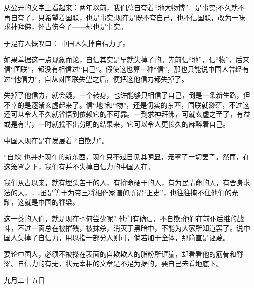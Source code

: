 
    从公开的文字上看起来：两年以前，我们总自夸着“地大物博”，是事实;不久就不再自夸了，只希望着国联，也是事实;现在是既不夸自己，也不信国联，改为一味求神拜佛，怀古伤今了——却也是事实。

    于是有人慨叹曰： 中国人失掉自信力了。

    如果单据这一点现象而论，自信其实是早就失掉了的。先前信“地”，信“物”，后来信“国联”，都没有相信过“自己”。假使这也算一种“信”，那也只能说中国人曾经有过“他信力”，自从对国联失望之后，便把这他信力都失掉了。

    失掉了他信力，就会疑，一个转身，也许能够只相信了自己，倒是一条新生路，但不幸的是逐渐玄虚起来了。信“地”和“物”，还是切实的东西，国联就渺茫，不过这还可以令人不久就省悟到依赖它的不可靠。一到求神拜佛，可就玄虚之至了，有益或是有害，一时就找不出分明的结果来，它可以令人更长久的麻醉着自己。

    中国人现在是在发展着 “自欺力”。

    “自欺”也并非现在的新东西，现在只不过日见其明显，笼罩了一切罢了。然而，在这笼罩之下，我们有并不失掉自信力的中国人在。

    我们从古以来，就有埋头苦干的人，有拚命硬干的人，有为民请命的人，有舍身求法的人，……虽是等于为帝王将相作家谱的所谓“正史”，也往往掩不住他们的光耀，这就是中国的脊梁。

    这一类的人们，就是现在也何尝少呢? 他们有确信，不自欺;他们在前仆后继的战斗，不过一面总在被摧残，被抹杀，消灭于黑暗中，不能为大家所知道罢了。说中国人失掉了自信力，用以指一部分人则可，倘若加于全体，那简直是诬蔑。

    要论中国人，必须不被搽在表面的自欺欺人的脂粉所诓骗，却看看他的筋骨和脊梁。自信力的有无，状元宰相的文章是不足为据的，要自己去看地底下。

    \hfill 九月二十五日

